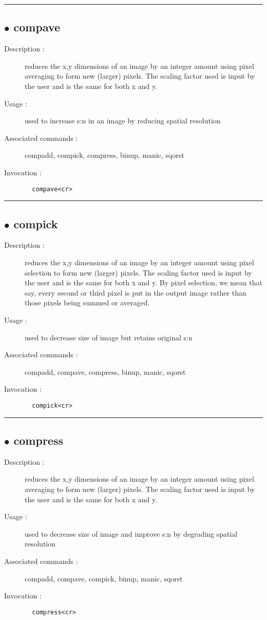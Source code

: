 \hrule \subsection*{$\bullet$ compave}
\begin{description}
\item[Description :] reduces the x,y dimensions of an image by an integer amount
using pixel averaging to form new (larger) pixels.  The scaling factor
used is input by the user and is the same for both x and y.
\item[Usage :] used to increase s:n in an image by reducing spatial resolution
\item[Associated commands :] compadd, compick, compress, binup, manic, sqorst
\item[Invocation :]

\verb+  compave<cr> +\end{description}

\hrule \subsection*{$\bullet$ compick}
\begin{description}
\item[Description :] reduces the x,y dimensions of an image by an integer amount
using pixel selection to form new (larger) pixels.  The scaling factor
used is input by the user and is the same for both x and y.  By pixel
selection, we mean that say, every second or third pixel is put in the
output image rather than those pixels being summed or averaged.
\item[Usage :] used to decrease size of image but retains original s:n
\item[Associated commands :] compadd, compave, compress, binup, manic, sqorst
\item[Invocation :]

\verb+  compick<cr> +\end{description}

\hrule \subsection*{$\bullet$ compress}
\begin{description}
\item[Description :] reduces the x,y dimensions of an image by an integer amount
using pixel averaging to form new (larger) pixels.  The scaling factor
used is input by the user and is the same for both x and y.
\item[Usage :] used to decrease size of image and improve s:n by degrading
spatial resolution
\item[Associated commands :] compadd, compave, compick, binup, manic, sqorst
\item[Invocation :]

\verb+  compress<cr> +\end{description}

